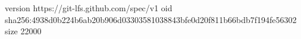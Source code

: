 version https://git-lfs.github.com/spec/v1
oid sha256:4938d0b224b6ab20b906d03303581038843bfe0d20f811b66bdb7f194fe56302
size 22000
